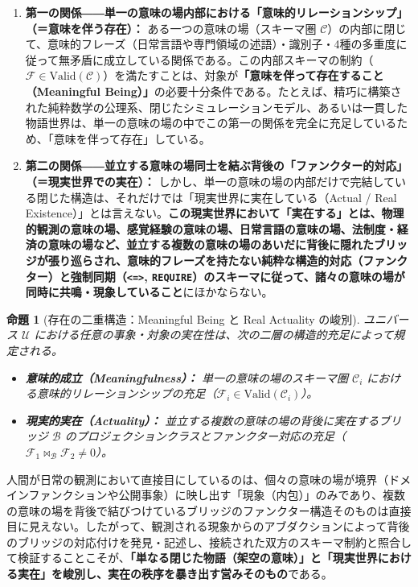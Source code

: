 \documentclass[11pt,a4paper]{ltjsarticle}
\theoremstyle{definition}
\theoremstyle{plain}
\newtheorem{proposition}{命題}[section]
\theoremstyle{remark}
\newcommand{\Valid}{\mathrm{Valid}}
\begin{document}
\begin{enumerate}
    \item \textbf{第一の関係――単一の意味の場内部における「意味的リレーションシップ」（＝意味を伴う存在）：}
    ある一つの意味の場（スキーマ圏 $\mathcal{C}$）の内部に閉じて、意味的フレーズ（日常言語や専門領域の述語）・識別子・4種の多重度に従って無矛盾に成立している関係である。この内部スキーマの制約（$\mathcal{F} \in \Valid(\mathcal{C})$）を満たすことは、対象が\textbf{「意味を伴って存在すること（Meaningful Being）」}の必要十分条件である。たとえば、精巧に構築された純粋数学の公理系、閉じたシミュレーションモデル、あるいは一貫した物語世界は、単一の意味の場の中でこの第一の関係を完全に充足しているため、「意味を伴って存在」している。
    \item \textbf{第二の関係――並立する意味の場同士を結ぶ背後の「ファンクター的対応」（＝現実世界での実在）：}
    しかし、単一の意味の場の内部だけで完結している閉じた構造は、それだけでは「現実世界に実在している（Actual / Real Existence）」とは言えない。\textbf{この現実世界において「実在する」とは、物理的観測の意味の場、感覚経験の意味の場、日常言語の意味の場、法制度・経済の意味の場など、並立する複数の意味の場のあいだに背後に隠れたブリッジが張り巡らされ、意味的フレーズを持たない純粋な構造的対応（ファンクター）と強制同期（\texttt{<=>}, \texttt{REQUIRE}）のスキーマに従って、諸々の意味の場が同時に共鳴・現象していること}にほかならない。
\end{enumerate}

\begin{proposition}[存在の二重構造：Meaningful Being と Real Actuality の峻別]\label{prop:dual-being}
ユニバース $\mathcal{U}$ における任意の事象・対象の実在性は、次の二層の構造的充足によって規定される。
\begin{itemize}
    \item \textbf{意味的成立（Meaningfulness）：} 単一の意味の場のスキーマ圏 $\mathcal{C}_i$ における意味的リレーションシップの充足（$\mathcal{F}_i \in \Valid(\mathcal{C}_i)$）。
    \item \textbf{現実的実在（Actuality）：} 並立する複数の意味の場の背後に実在するブリッジ $\mathcal{B}$ のプロジェクションクラスとファンクター対応の充足（$\mathcal{F}_1 \bowtie_{\mathcal{B}} \mathcal{F}_2 \neq 0$）。
\end{itemize}
\end{proposition}

人間が日常の観測において直接目にしているのは、個々の意味の場が境界（ドメインファンクションや公開事象）に映し出す「現象（内包）」のみであり、複数の意味の場を背後で結びつけているブリッジのファンクター構造そのものは直接目に見えない。したがって、観測される現象からのアブダクションによって背後のブリッジの対応付けを発見・記述し、接続された双方のスキーマ制約と照合して検証することこそが、\textbf{「単なる閉じた物語（架空の意味）」と「現実世界における実在」を峻別し、実在の秩序を暴き出す営みそのもの}である。
\end{document}
